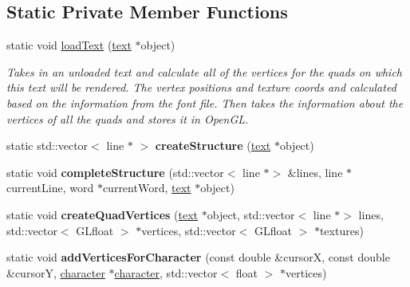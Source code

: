 \subsection*{Static Private Member Functions}
\begin{DoxyCompactItemize}
\item 
static void \hyperlink{classflounder_1_1text_aa5fea613182b186ca1c7b52900378e03}{load\+Text} (\hyperlink{classflounder_1_1text}{text} $\ast$object)
\begin{DoxyCompactList}\small\item\em Takes in an unloaded text and calculate all of the vertices for the quads on which this text will be rendered. The vertex positions and texture coords and calculated based on the information from the font file. Then takes the information about the vertices of all the quads and stores it in Open\+GL. \end{DoxyCompactList}\item 
\mbox{\label{classflounder_1_1text_ac76703f9a2b6be0ce073f0f3fe4d59d3}} 
static std\+::vector$<$ line $\ast$ $>$ {\bfseries create\+Structure} (\hyperlink{classflounder_1_1text}{text} $\ast$object)
\item 
\mbox{\label{classflounder_1_1text_a926f4d1af6eaa7e2f5559a9a650db49d}} 
static void {\bfseries complete\+Structure} (std\+::vector$<$ line $\ast$$>$ \&lines, line $\ast$current\+Line, word $\ast$current\+Word, \hyperlink{classflounder_1_1text}{text} $\ast$object)
\item 
\mbox{\label{classflounder_1_1text_a05affa53abc477470ca16e9ab85c602c}} 
static void {\bfseries create\+Quad\+Vertices} (\hyperlink{classflounder_1_1text}{text} $\ast$object, std\+::vector$<$ line $\ast$$>$ lines, std\+::vector$<$ G\+Lfloat $>$ $\ast$vertices, std\+::vector$<$ G\+Lfloat $>$ $\ast$textures)
\item 
\mbox{\label{classflounder_1_1text_ab0f58730a8d2d52f73d86cfd85ec3ed9}} 
static void {\bfseries add\+Vertices\+For\+Character} (const double \&cursorX, const double \&cursorY, \hyperlink{classflounder_1_1character}{character} $\ast$\hyperlink{classflounder_1_1character}{character}, std\+::vector$<$ float $>$ $\ast$vertices)
\item 
\mbox{\label{classflounder_1_1text_a22290714a138cf4fad5c1eb723e7e245}} 

\end{DoxyCompactItemize}
